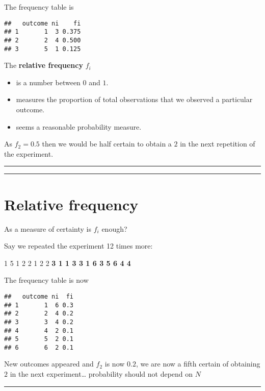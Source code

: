 \documentclass[
]{book}
\providecommand{\tightlist}{%
  \setlength{\itemsep}{0pt}\setlength{\parskip}{0pt}}
\begin{document}
The frequency table is

\begin{verbatim}
##   outcome ni    fi
## 1       1  3 0.375
## 2       2  4 0.500
## 3       5  1 0.125
\end{verbatim}

The \textbf{relative frequency} \(f_i\)

\begin{itemize}
\tightlist
\item
  is a number between \(0\) and \(1\).
\item
  measures the proportion of total observations that we observed a particular outcome.
\item
  seems a reasonable probability measure.
\end{itemize}

As \(f_2=0.5\) then we would be half certain to obtain a \(2\) in the next repetition of the experiment.

\begin{center}\rule{0.5\linewidth}{0.5pt}\end{center}

\begin{center}\rule{0.5\linewidth}{0.5pt}\end{center}

\hypertarget{relative-frequency}{%
\section{Relative frequency}\label{relative-frequency}}

As a measure of certainty is \(f_i\) enough?

Say we repeated the experiment 12 times more:

1 5 1 2 2 1 2 2 \textbf{3 1 1 3 3 1 6 3 5 6 4 4}

The frequency table is now

\begin{verbatim}
##   outcome ni  fi
## 1       1  6 0.3
## 2       2  4 0.2
## 3       3  4 0.2
## 4       4  2 0.1
## 5       5  2 0.1
## 6       6  2 0.1
\end{verbatim}

New outcomes appeared and \(f_2\) is now \(0.2\), we are now a fifth certain of obtaining \(2\) in the next experiment\ldots{} probability should not depend on \(N\)

\begin{center}\rule{0.5\linewidth}{0.5pt}\end{center}
\end{document}

